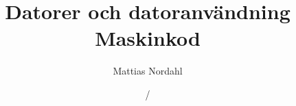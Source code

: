 \documentclass[trans]{beamer}
\author[]{Mattias Nordahl}
\institute{\url{mattias.nordahl@cs.lth.se}}
\date{}
\begin{document}
 

\title{Datorer och datoranvändning\\Maskinkod} 

\frame[plain]{
\maketitle

\vspace{-2\baselineskip}
}

\date{\the\year/\the\numexpr{}} 


\end{document}
